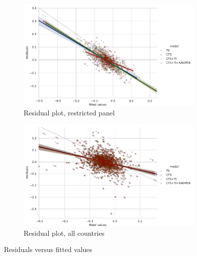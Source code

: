 \documentclass[12pt,a4paper]{article}
\begin{document}
\begin{figure}[htbp]
\centering
\begin{subfigure}{0.90\textwidth}
\includegraphics[width=\textwidth]{./plots/dis/diffGMM_residual_plot_subset.pdf}
\caption{Residual plot, restricted panel}
\end{subfigure}
\begin{subfigure}{0.90\textwidth}
\includegraphics[width=\textwidth]{./plots/dis/diffGMM_residual_plot_all.pdf}
\caption{Residual plot, all countries}
\end{subfigure}
\caption{Residuals versus fitted values}
\label{fig:gmm_residual_plot}
\end{figure}



\restoregeometry{}
\end{document}
